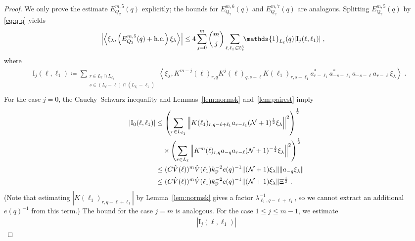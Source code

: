 \documentclass[12pt,a4paper]{article}
\numberwithin{equation}{section}
\newcommand{\1}{\mathbb{I}}
\newcommand{\F}{\mathrm{F}}
\newcommand{\I}{\mathrm{I}}
\newcommand{\Z}{\mathbb{Z}}
\newcommand{\NN}{\mathcal{N}}
\newcommand{\half}{\frac{1}{2}}
\newcommand{\eva}[1]{\left\langle #1 \right\rangle}
\theoremstyle{plain}
\theoremstyle{definition}
\theoremstyle{remark}
\theoremstyle{plain}
\theoremstyle{definition}
\theoremstyle{remark}
\begin{document}
\begin{proof}
We only prove the estimate $ E^{m,5}_{Q_2}(q) $ explicitly; the bounds for $ E^{m,6}_{Q_2}(q) $ and $ E^{m,7}_{Q_2}(q) $ are analogous. Splitting $ E^{m,5}_{Q_2}(q) $ by \eqref{eq:q-q} yields
\begin{equation} \label{eq:EQ2131}
\begin{aligned}
	& \abs{\eva{\xi_\lambda,\left(E^{m,5}_{Q_2}(q) +\mathrm{h.c.}\right) \xi_\lambda }}
	\le 4 \sum_{j=0}^m {{m}\choose j} \sum_{\ell,\ell_1  \in \Z^3_*}\!\! \mathds{1}_{L_\ell}(q) |\I_j(\ell, \ell_1)| \;,
	\end{aligned}
\end{equation}
where
\begin{equation}
\begin{aligned}
	& \I_j(\ell, \ell_1)
	\coloneq \sum_{\substack{r\in L_{\ell} \cap L_{\ell_1}\\ s \in (L_{\ell} - \ell) \cap (L_{\ell_1} - \ell_1)}}
		\eva{\xi_\lambda, K^{m-j}(\ell)_{r,q} K^{j}(\ell)_{q,s+\ell} K(\ell_1)_{r,s+\ell_1} a^*_{r-\ell_1} a^*_{-s-\ell_1} a_{-s-\ell} a_{r-\ell} \xi_\lambda} \;. \\
\end{aligned}
\end{equation}
For the case $ j = 0 $, the Cauchy--Schwarz inequality and Lemmas~\ref{lem:normsk} and~\ref{lem:pairest} imply
\begin{align}
	|\I_0(\ell, \ell_1)| 	&\leq \left(\sum_{r\in L_{\ell_1}} \norm{ K(\ell_1)_{r,q-\ell+\ell_1} a_{r-\ell_1}(\NN+1)^{\half} \xi_\lambda}^2\right)^\half \\
	& \quad \times 	\left(\sum_{r\in L_{\ell}} \norm{ K^m(\ell)_{r,q} a_{-q}a_{r-\ell} (\NN+1)^{-\half} \xi_\lambda }^2 \right)^\half \nonumber\\
	&\leq (C \hat{V}(\ell))^m \hat{V}(\ell_1) k_{\F}^{-2} e(q)^{-1} \norm{ (\NN+1) \xi_\lambda} \norm{ a_{-q} \xi_\lambda } \nonumber \\
	&\leq (C \hat{V}(\ell))^m
		\hat{V}(\ell_1)
		k_{\F}^{-2} e(q)^{-1}
		\norm{ (\NN+1) \xi_\lambda} \Xi^{\half} \;.
\end{align}
(Note that estimating $ |K(\ell_1)_{r,q-\ell+\ell_1}| $ by Lemma~\ref{lem:normsk} gives a factor $ \lambda_{\ell_1,q-\ell+\ell_1}^{-1} $, so we cannot extract an additional $ e(q)^{-1} $ from this term.) The bound for the case $j=m$ is analogous. For the case $ 1 \le j \le m-1 $, we estimate
\begin{align}
	|\I_j(\ell, \ell_1)|

\end{align}
\end{proof}
\end{document}
